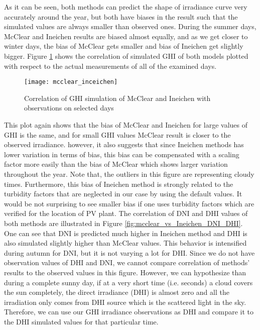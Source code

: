 As it can be seen, both methods can predict the shape of irradiance curve very accurately around the year, but both have biases in the result such that the simulated values are always smaller than observed ones. During the summer days, McClear and Ineichen results are biased almost equally, and as we get closer to winter days, the bias of McClear gets smaller and bias of Ineichen get slightly bigger. 
Figure \ref{fig:mcclear_to_Ineichen} shows the correlation of simulated GHI of both models plotted with respect to the actual measurements of all of the examined days.

\begin{figure}[h!]
\caption{Correlation of GHI simulation of McClear and Ineichen with observations on selected days}
\label{fig:mcclear_to_Ineichen}
\texttt{[image: mcclear\_inceichen]}
\centering
\end{figure}

This plot again shows that the bias of McClear and Ineichen for large values of GHI is the same, and for small GHI values McClear result is closer to the observed irradiance. however, it also suggests that since Ineichen methods has lower variation in terms of bias, this bias can be compensated with a scaling factor more easily than the bias of McClear which shows larger variation throughout the year. Note that, the outliers in this figure are representing cloudy times. Furthermore, this bias of Ineichen method is strongly related to the turbidity factors that are neglected in our case by using the default values. It would be not surprising to see smaller bias if one uses turbidity factors which are verified for the location of PV plant. The correlation of DNI and DHI values of both methods are illustrated in Figure \ref{fig:mcclear_vs_Ineichen_DNI_DHI}. One can see that DNI is predicted much higher in Ineichen method and DHI is also simulated slightly higher than McClear values. This behavior is intensified during autumn for DNI, but it is not varying a lot for DHI. Since we do not have observation values of DHI and DNI, we cannot compare correlation of methods' results to the observed values in this figure. However, we can hypothesize than during a complete sunny day, if at a very short time (i.e. seconds) a cloud covers the sun completely, the direct irradiance (DHI) is almost zero and all the irradiation only comes from DHI source which is the scattered light in the sky. Therefore, we can use our GHI irradiance observations as DHI and compare it to the DHI simulated values for that particular time. 


